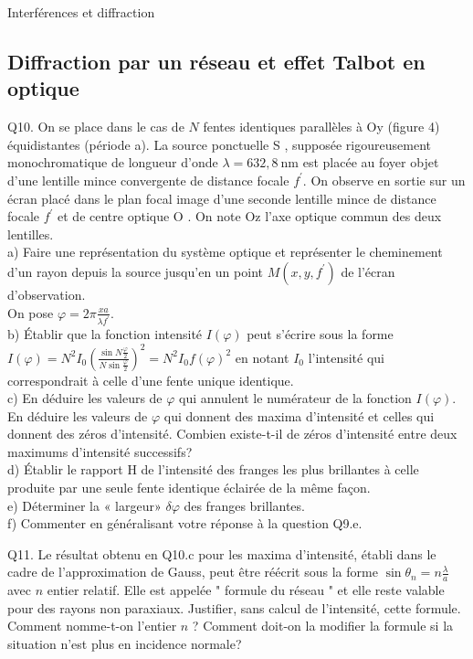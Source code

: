 \begin{exo}[PC][1][devoir]{Interférences et diffraction}
{\subsection{Diffraction par un réseau et effet Talbot en optique}
Q10. On se place dans le cas de $N$ fentes identiques parallèles à Oy (figure 4) équidistantes (période a). La source ponctuelle S , supposée rigoureusement monochromatique de longueur d'onde $\lambda=632,8 \mathrm{~nm}$ est placée au foyer objet d'une lentille mince convergente de distance focale $f^{\prime}$. On observe en sortie sur un écran placé dans le plan focal image d'une seconde lentille mince de distance focale $f^{\prime}$ et de centre optique O . On note Oz l'axe optique commun des deux lentilles.\\
a) Faire une représentation du système optique et représenter le cheminement d'un rayon depuis la source jusqu'en un point $M\left(x, y, f^{\prime}\right)$ de l'écran d'observation.\\
On pose $\varphi=2 \pi \frac{x a}{\lambda f^{\prime}}$.\\
b) Établir que la fonction intensité $I(\varphi)$ peut s'écrire sous la forme $I(\varphi)=N^{2} I_{0}\left(\frac{\sin N \frac{\varphi}{2}}{N \sin \frac{\varphi}{2}}\right)^{2}=N^{2} I_{0} f(\varphi)^{2}$ en notant $I_{0}$ l'intensité qui correspondrait à celle d'une fente unique identique.\\
c) En déduire les valeurs de $\varphi$ qui annulent le numérateur de la fonction $I(\varphi)$. En déduire les valeurs de $\varphi$ qui donnent des maxima d'intensité et celles qui donnent des zéros d'intensité. Combien existe-t-il de zéros d'intensité entre deux maximums d'intensité successifs?\\
d) Établir le rapport H de l'intensité des franges les plus brillantes à celle produite par une seule fente identique éclairée de la même façon.\\
e) Déterminer la « largeur» $\delta \varphi$ des franges brillantes.\\
f) Commenter en généralisant votre réponse à la question Q9.e.

Q11. Le résultat obtenu en Q10.c pour les maxima d'intensité, établi dans le cadre de l'approximation de Gauss, peut être réécrit sous la forme $\sin \theta_{n}=n \frac{\lambda}{a}$ avec $n$ entier relatif. Elle est appelée " formule du réseau " et elle reste valable pour des rayons non paraxiaux. Justifier, sans calcul de l'intensité, cette formule. Comment nomme-t-on l'entier $n$ ? Comment doit-on la modifier la formule si la situation n'est plus en incidence normale?

}
\end{exo}
